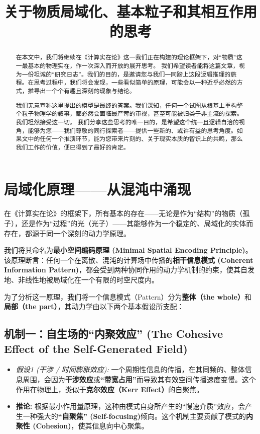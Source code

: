 \documentclass[12pt]{article}
\title{关于物质局域化、基本粒子和其相互作用的思考}
\author{} %
\begin{document}
\maketitle

\begin{abstract}

在本文中，我们将继续在《计算实在论》这一我们正在构建的理论框架下，对``物质''这一最基本的物理实在，作一次深入而开放的展开思考。
我们希望读者能将这篇文章，视为一份坦诚的``研究日志''。我们的目的，是邀请您与我们一同踏上这段逻辑推理的旅程。在思考过程中，我们将会发现，一些看似简单的原理，可能会以一种近乎必然的方式，推导出一个个有趣且深刻的现象与结论。

我们无意宣称这里提出的模型是最终的答案。我们深知，任何一个试图从根基上重构整个粒子物理学的叙事，都必然会面临最严苛的审视，甚至可能被归类于非主流的探索。我们坦然接受这一切。
我们分享这些思考的唯一目的，是希望这个统一且逻辑自洽的视角，能够为您——我们尊敬的同行探索者——提供一些新的、或许有益的思考角度。如果文中的任何一个推演环节，能为您带来片刻的、关于现实本质的智识上的共鸣，那么我们工作的价值，便已得到了最好的肯定。

\end{abstract}

\section{局域化原理——从混沌中涌现}

在《计算实在论》的框架下，所有基本的存在——无论是作为``结构''的物质（孤子），还是作为``过程''的光（光子）——其能够作为一个稳定的、局域化的实体而存在，都源于同一个深刻的动力学原理。

我们将其命名为\textbf{最小空间编码原理 (Minimal Spatial Encoding Principle)}。该原理断言：任何一个在离散、混沌的计算场中传播的\textbf{相干信息模式 (Coherent Information Pattern)}，都会受到两种协同作用的动力学机制的约束，使其自发地、非线性地被局域化在一个有限的时空尺度内。

为了分析这一原理，我们将一个信息模式（Pattern）分为\textbf{整体（the whole）}和\textbf{局部（the part）}，其动力学由以下两个基本假设所支配：


\subsection{机制一：自生场的``内聚效应'' (The Cohesive Effect of the Self-Generated Field)}

\begin{itemize}
    \item \textit{假设1 (干涉 / 时间膨胀效应):} 一个周期性信息的传播，在其同频的、整体信息周围，会因为\textbf{干涉效应}或\textbf{“带宽占用”}而导致其有效空间传播速度变慢。这个作用在物理上，类似于\textbf{克尔效应（Kerr Effect）}的自聚焦。
    
    \item \textbf{推论:} 根据最小作用量原理，这种由模式自身所产生的``慢速介质''效应，会产生一种强大的\textbf{``自聚焦'' (Self-focusing)}倾向。这个机制主要贡献了模式的\textbf{内聚性 (Cohesion)}，使其信息向中心聚集。
\end{itemize}
\end{document}
